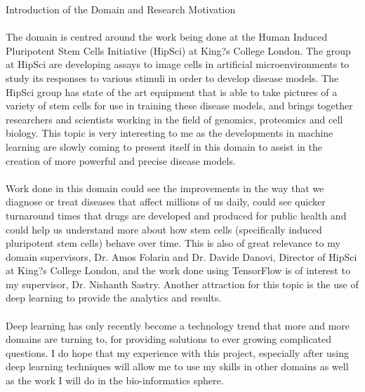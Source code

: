 {Introduction of the Domain and Research Motivation \\ \\ 
The domain is centred around the work being done at the Human Induced Pluripotent Stem Cells Initiative (HipSci) at King?s College London. The group at HipSci are developing assays to image cells in artificial microenvironments to study its responses to various stimuli in order to develop disease models. The HipSci group has state of the art equipment that is able to take pictures of a variety of stem cells for use in training these disease models, and brings together researchers and scientists working in the field of genomics, proteomics and cell biology. This topic is very interesting to me as the developments in machine learning are slowly coming to present itself in this domain to assist in the creation of more powerful and precise disease models. \\ \\ 
Work done in this domain could see the improvements in the way that we diagnose or treat diseases that affect millions of us daily, could see quicker turnaround times that drugs are developed and produced for public health and could help us understand more about how stem cells (specifically induced pluripotent stem cells) behave over time. This is also of great relevance to my domain supervisors, Dr. Amos Folarin and Dr. Davide Danovi, Director of HipSci at King?s College London, and the work done using TensorFlow is of interest to my supervisor, Dr. Nishanth Sastry. Another attraction for this topic is the use of deep learning to provide the analytics and results. \\ \\ 
Deep learning has only recently become a technology trend that more and more domains are turning to, for providing solutions to ever growing complicated questions. I do hope that my experience with this project, especially after using deep learning techniques will allow me to use my skills in other domains as well as the work I will do in the bio-informatics sphere. }
